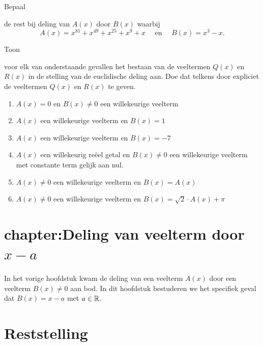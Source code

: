 \documentclass{ximera}
\begin{document}
\begin{exercise} 
\hypertarget{oef2.19}{Bepaal} de rest bij deling van $A(x)$ door $B(x)$ waarbij
\[
A(x) = x^{81} + x^{49} + x^{25} + x^{9} + x \quad \text{ en } \quad B(x) = x^3-x.
\]
\end{exercise} 

\begin{exercise} 
\hypertarget{oef2.20}{Toon} voor elk van onderstaande gevallen het bestaan van de veeltermen $Q(x)$ en $R(x)$ in de stelling van de euclidische deling aan. Doe dat telkens door expliciet de veeltermen $Q(x)$ en $R(x)$ te geven. 
\begin{enumerate}
\item
$A(x) = 0$ en $B(x) \neq 0$ een willekeurige veelterm 
\item
$A(x)$ een willekeurige veelterm en $B(x) = 1$
\item
$A(x)$ een willekeurige veelterm en $B(x) = -7$
\item
$A(x)$ een willekeurig re\"eel getal en $B(x) \neq 0$ een willekeurige veelterm met constante term gelijk aan nul.
\item
$A(x) \neq 0$ een willekeurige veelterm en $B(x) = A(x)$
\item
$A(x) \neq 0$ een willekeurige veelterm en $B(x) = \sqrt{2}\cdot A(x)+\pi$
\end{enumerate}
\end{exercise} 














\section{chapter:Deling van veelterm door \texorpdfstring{$x-a$}{x-a}}

In het vorige hoofdstuk kwam de deling van een veelterm $A(x)$ door een veelterm $B(x) \neq 0$ aan bod. In dit hoofdstuk bestuderen we het specifiek geval dat $B(x) = x-a$ met $a \in \mathbb{R}$.














\section{Reststelling}
\end{document}
